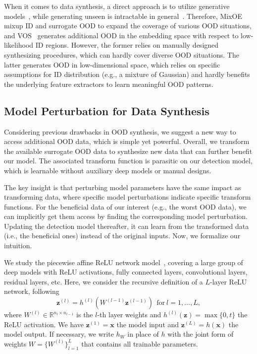 \documentclass{article} \usepackage{iclr2022_conference,times}
\begin{document}
When it comes to data synthesis, a direct approach is to utilize generative models~\citep{LeeLLS18}, while generating unseen is intractable in general~\citep{du2022vos}. Therefore, MixOE~\citep{zhang2021mixture} mixup ID and surrogate OOD to expand the coverage of various OOD situations, and VOS~\citep{du2022vos} generates additional OOD in the embedding space with respect to low-likelihood ID regions. However, the former relies on manually designed synthesizing procedures, which can hardly cover diverse OOD situations. The latter generates OOD in low-dimensional space, which relies on specific assumptions for ID distribution (e.g., a mixture of Gaussian) and hardly benefits the underlying feature extractors to learn meaningful OOD patterns. 








\subsection{Model Perturbation for Data Synthesis} \label{sec: motivation}


Considering previous drawbacks in OOD synthesis, we suggest a new way to access additional OOD data, which is simple yet powerful. Overall, we transform the available surrogate OOD data to synthesize new data that can further benefit our model. The associated transform function is parasitic on our detection model, which is learnable without auxiliary deep models or manual designs. 


The key insight is that perturbing model parameters have the same impact as transforming data, where specific model perturbations indicate specific transform functions. {For the beneficial data of our interest (e.g., the worst OOD data), we can implicitly get them access by finding the corresponding model perturbation. Updating the detection model thereafter, it can learn from the transformed data (i.e., the beneficial ones) instead of the original inputs.} Now, we formalize our intuition. 







We study the piecewise affine ReLU network model~\citep{AroraBMM18}, covering a large group of deep models with ReLU activations, fully connected layers, convolutional layers, residual layers, etc. Here, we consider the recursive definition of a $L$-layer ReLU network, following
\begin{equation}
\boldsymbol{z}^{(l)}=h^{(l)}(W^{(l-1)} \boldsymbol{z}^{(l-1)})~~\text{for}~l=1,\ldots,L, \label{eq: relu network}
\end{equation}
where $W^{(l)}\in\mathbb{R}^{n_l\times n_{l-1}}$ is the $l$-th layer weights and $h^{(l)}(\boldsymbol{z})=\max\{0,t\}$ the ReLU activation. We have $\boldsymbol{z}^{(1)}=\boldsymbol{x}$ the model input and $\boldsymbol{z}^{(L)}=h(\boldsymbol{x})$ the model output. If necessary, we write $h_{W}$ in place of $h$ with the joint form of weights ${W}=\{W^{(l)}\}_{l=1}^L$ that contains all trainable parameters. 
\end{document}

